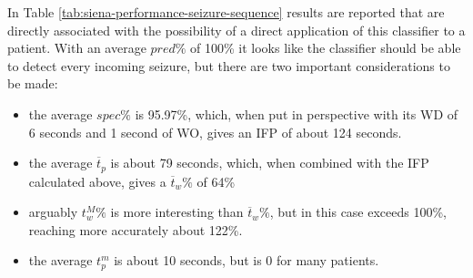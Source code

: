 In Table \ref{tab:siena-performance-seizure-sequence} results are reported that are directly associated with the possibility of a direct application of this classifier to a patient.
With an average $pred\%$ of 100\% it looks like the classifier should be able to detect every incoming seizure, but there are two important considerations to be made:
\begin{itemize}
    \item the average $spec\%$ is 95.97\%, which, when put in perspective with its \gls{WD} of 6 seconds and 1 second of \gls{WO}, gives an \gls{IFP} of about 124 seconds.
    \item the average $\overline{t}_p$ is about 79 seconds, which, when combined with the \gls{IFP} calculated above, gives a $\overline{t}_w\%$ of 64\%
    \item arguably $t_w^M\%$ is more interesting than $\overline{t}_w\%$, but in this case exceeds 100\%, reaching more accurately about 122\%.
    \item the average $t_p^m$ is about 10 seconds, but is 0 for many patients.
\end{itemize}

